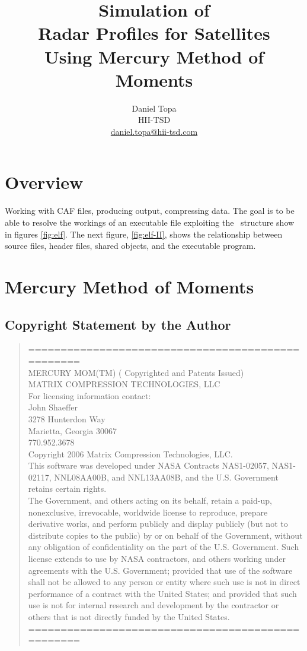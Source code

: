 \documentclass[10pt, oneside]{article}   	%
\title{Simulation of \\Radar Profiles for Satellites \\Using Mercury Method of Moments}
\author{Daniel Topa\\HII-TSD\\\href{mailto:daniel.topa@hii-tsd.com}{daniel.topa@hii-tsd.com}}
\begin{document}
\maketitle
{}
\tableofcontents

\section{Overview}
\cite{topa20200303}
Working with CAF files, producing output, compressing data.
\cite{topa-4-20-2024}
\cite{topa-4-20-2024}
The goal is to be able to resolve the workings of an executable file exploiting the \elf \ structure show in figures \ref{fig:elf}. The next figure, \ref{fig:elf-II}, shows the relationship between source files, header files, shared objects, and the executable program.

\section{Mercury Method of Moments}
\subsection{Copyright Statement by the Author}
\begin{quotation}
{\footnotesize{
\noindent
==================================================\\
    MERCURY MOM(TM) ( Copyrighted and Patents Issued) \\
	MATRIX COMPRESSION TECHNOLOGIES, LLC \\[10pt]
	For licensing information contact: \\
	John Shaeffer\\
	3278 Hunterdon Way\\
	Marietta, Georgia 30067\\
	770.952.3678 \\	
	Copyright 2006 Matrix Compression Technologies, LLC.\\	[10pt]
	This software was developed under NASA Contracts NAS1-02057, NAS1-02117, 
	NNL08AA00B, and NNL13AA08B, and the U.S. Government retains certain rights.\\[10pt]
	The Government, and others acting on its behalf, retain a paid-up, 
	nonexclusive, irrevocable, worldwide license to reproduce, prepare 
	derivative works, and perform publicly and display publicly (but not to 
	distribute copies to the public) by or on behalf of the Government, without
	any obligation of confidentiality on the part of the U.S. Government. Such
	license extends to use by NASA contractors, and others working under 
	agreements with the U.S. Government; provided that use of the software shall
	not be allowed to any person or entity where such use is not in direct 
	performance of a contract with the United States; and provided that such use
	is not for internal research and development by the contractor or others 
	that is not directly funded by the United States.
==================================================
}}
\end{quotation}
\end{document}
